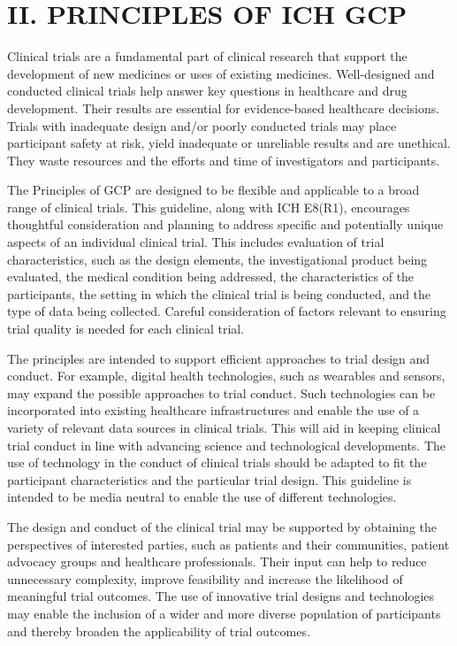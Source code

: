 \documentclass[11pt]{article}
\begin{document}
\section{II. PRINCIPLES OF ICH GCP}

Clinical trials are a fundamental part of clinical research that support the development of new medicines or uses of existing medicines. Well-designed and conducted clinical trials help answer key questions in healthcare and drug development. Their results are essential for evidence-based healthcare decisions. Trials with inadequate design and/or poorly conducted trials may place participant safety at risk, yield inadequate or unreliable results and are unethical. They waste resources and the efforts and time of investigators and participants.


The Principles of GCP are designed to be flexible and applicable to a broad range of clinical trials. This guideline, along with ICH E8(R1), encourages thoughtful consideration and planning to address specific and potentially unique aspects of an individual clinical trial. This includes evaluation of trial characteristics, such as the design elements, the investigational product being evaluated, the medical condition being addressed, the characteristics of the participants, the setting in which the clinical trial is being conducted, and the type of data being collected. Careful consideration of factors relevant to ensuring trial quality is needed for each clinical trial.


The principles are intended to support efficient approaches to trial design and conduct. For example, digital health technologies, such as wearables and sensors, may expand the possible approaches to trial conduct. Such technologies can be incorporated into existing healthcare infrastructures and enable the use of a variety of relevant data sources in clinical trials. This will aid in keeping clinical trial conduct in line with advancing science and technological developments. The use of technology in the conduct of clinical trials should be adapted to fit the participant characteristics and the particular trial design. This guideline is intended to be media neutral to enable the use of different technologies.


The design and conduct of the clinical trial may be supported by obtaining the perspectives of interested parties, such as patients and their communities, patient advocacy groups and healthcare professionals. Their input can help to reduce unnecessary complexity, improve feasibility and increase the likelihood of meaningful trial outcomes. The use of innovative trial designs and technologies may enable the inclusion of a wider and more diverse population of participants and thereby broaden the applicability of trial outcomes.
\end{document}
